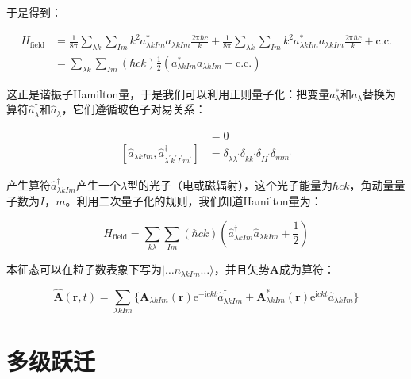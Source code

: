 \begin{booknote*}
于是得到：

\begin{align*}
H_{\text{field}} & =\frac{1}{8\mathrm{\pi}}\sum_{\lambda k}\sum_{Im}k^{2}a^{*}_{\lambda kIm}a_{\lambda kIm}\frac{2\mathrm{\pi}\hbar c}{k}+\frac{1}{8\mathrm{\pi}}\sum_{\lambda k}\sum_{Im}k^{2}a^{*}_{\lambda kIm}a_{\lambda kIm}\frac{2\mathrm{\pi}\hbar c}{k}+\text{c.c.}\\
 & =\sum_{\lambda k}\sum_{Im}(\hbar ck)\frac{1}{2}\left(a^{*}_{\lambda kIm}a_{\lambda kIm}+\text{c.c.}\right)
\end{align*}
\end{booknote*}
这正是谐振子Hamilton量，于是我们可以利用正则量子化：把变量$a^{*}_{\lambda}$和$a_{\lambda}$替换为算符$\hat{a}^{\dagger}_{\lambda}$和$\hat{a}_{\lambda}$，它们遵循玻色子对易关系：

\begin{align}
[\hat{a}_{\lambda kIm},\hat{a}_{\lambda^{\prime}k^{\prime}I^{\prime}m^{\prime}}] & =0\nonumber \\{}
[\hat{a}_{\lambda kIm},\hat{a}^{\dagger}_{\lambda^{\prime}k^{\prime}I^{\prime}m^{\prime}}] & =\delta_{\lambda\lambda^{\prime}}\delta_{kk^{\prime}}\delta_{II^{\prime}}\delta_{mm^{\prime}}
\end{align}

产生算符$\hat{a}^{\dagger}_{\lambda kIm}$产生一个$\lambda$型的光子（电或磁辐射），这个光子能量为$\hbar ck$，角动量量子数为$I$，$m$。利用二次量子化的规则，我们知道Hamilton量为：

\begin{equation}
H_{\text{field}}=\sum_{k\lambda}\sum_{Im}(\hbar ck)\left(\hat{a}^{\dagger}_{\lambda kIm}\hat{a}_{\lambda kIm}+\frac{1}{2}\right)
\end{equation}

本征态可以在粒子数表象下写为$|\dots n_{\lambda kIm}\dots\rangle$，并且矢势$\boldsymbol{A}$成为算符：

\begin{equation}
\hat{\boldsymbol{A}}(\boldsymbol{r},t)=\sum_{\lambda kIm}\{\boldsymbol{A}_{\lambda kIm}(\boldsymbol{r})\mathrm{e}^{-\mathrm{i}ckt}\hat{a}^{\dagger}_{\lambda kIm}+\boldsymbol{A}^{*}_{\lambda kIm}(\boldsymbol{r})\mathrm{e}^{\mathrm{i}ckt}\hat{a}_{\lambda kIm}\}
\end{equation}


\section{多级跃迁}

